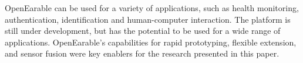 OpenEarable can be used for a variety of applications, such as health monitoring, authentication, identification and human-computer interaction.
The platform is still under development, but has the potential to be used for a wide range of applications. 
OpenEarable's capabilities for rapid prototyping, flexible extension, and sensor fusion were key enablers for the research presented in this paper.


